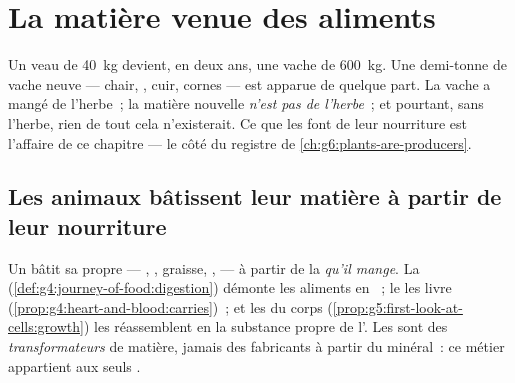 \chapter{La matière venue des aliments}\label{ch:g6:matter-from-food}

Un veau de \qty{40}{kg} devient, en deux ans, une vache de
\qty{600}{kg}. Une demi-tonne de vache neuve --- chair, , cuir,
cornes --- est apparue de quelque part. La vache a mangé de l'herbe~;
la matière nouvelle \emph{n'est pas de l'herbe}~; et pourtant, sans
l'herbe, rien de tout cela n'existerait. Ce que les  font de
leur nourriture est l'affaire de ce chapitre --- le côté
 du registre de \cref{ch:g6:plants-are-producers}.

\section{Les animaux bâtissent leur matière à partir de leur nourriture}

\begin{proposition}\label{prop:g6:matter-from-food:transform}
Un  bâtit sa propre  --- , , graisse,
,  --- à partir de la \emph{ qu'il
mange}. La  (\cref{def:g4:journey-of-food:digestion})
démonte les aliments en ~; le  les livre
(\cref{prop:g4:heart-and-blood:carries})~; et les  du corps
(\cref{prop:g5:first-look-at-cells:growth}) les réassemblent en la
substance propre de l'. Les  sont des
\emph{transformateurs} de matière, jamais des fabricants à partir du
minéral~: ce métier appartient aux seuls .
\end{proposition}
\admitted

